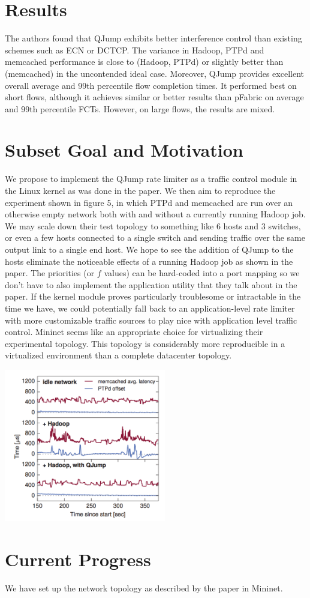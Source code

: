 \documentclass[12pt]{article}
\begin{document}
\section*{Results}
	The authors found that QJump exhibits better interference control than existing schemes such as ECN or DCTCP. The variance in Hadoop, PTPd and memcached performance is close to (Hadoop, PTPd) or slightly better than (memcached) in the uncontended ideal case. Moreover, QJump provides excellent overall average and 99th percentile flow completion times. It performed best on short flows, although it achieves similar or better results than pFabric on average and 99th percentile FCTs. However, on large flows, the results are mixed. 
	
\section*{Subset Goal and Motivation}
	We propose to implement the QJump rate limiter as a traffic control module in the Linux kernel as was done in the paper. We then aim to reproduce the experiment shown in figure 5, in which PTPd and memcached are run over an otherwise empty network both with and without a currently running Hadoop job. We may scale down their test topology to something like 6 hosts and 3 switches, or even a few hosts connected to a single switch and sending traffic over the same output link to a single end host. We hope to see the addition of QJump to the hosts eliminate the noticeable effects of a running Hadoop job as shown in the paper. The priorities (or $f$ values) can be hard-coded into a port mapping so we don't have to also implement the application utility that they talk about in the paper. If the kernel module proves particularly troublesome or intractable in the time we have, we could potentially fall back to an application-level rate limiter with more customizable traffic sources to play nice with application level traffic control. Mininet seems like an appropriate choice for virtualizing their experimental topology. This topology is considerably more reproducible in a virtualized environment than a complete datacenter topology.
	
	\includegraphics[width=200pt]{qjump.png} 
	
\section*{Current Progress}
	We have set up the network topology as described by the paper in Mininet. 
		
\end{document}
